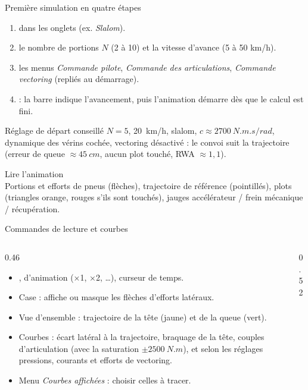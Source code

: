 \documentclass[aspectratio=169,9pt]{beamer}
\begin{document}
\begin{frame}{Première simulation en quatre étapes}
  \begin{enumerate}
    \item {} dans les onglets (ex. \emph{Slalom}).
    \item {} le nombre de portions $N$ (2 à 10) et la vitesse d'avance (5 à 50 km/h).
    \item {} les menus \emph{Commande pilote}, \emph{Commande des articulations}, \emph{Commande vectoring} (repliés au démarrage).
    \item {} : la barre indique l'avancement, puis l'animation démarre dès que le calcul est fini.
  \end{enumerate}
  \medskip
  \begin{block}{Réglage de départ conseillé}
    $N=5$, \SI{20}{km/h}, slalom, $c\approx\SI{2700}{N.m.s/rad}$, dynamique des vérins cochée, vectoring désactivé : le convoi suit la trajectoire (erreur de queue $\approx\SI{45}{cm}$, aucun plot touché, RWA $\approx1{,}1$).
  \end{block}
\end{frame}

\begin{frame}{Lire l'animation}
  \centering
  \\[1mm]
  {\footnotesize Portions et efforts de pneus (flèches), trajectoire de référence (pointillés), plots (triangles orange, rouges s'ils sont touchés), jauges accélérateur / frein mécanique / récupération.}
\end{frame}

\begin{frame}{Commandes de lecture et courbes}
  \begin{columns}[T]
  \begin{column}{0.46\textwidth}
    \begin{itemize}
      \item {},  d'animation (×1, ×2, …), curseur de temps.
      \item Case  : affiche ou masque les flèches d'efforts latéraux.
      \item Vue d'ensemble : trajectoire de la tête (jaune) et de la queue (vert).
      \item Courbes : écart latéral à la trajectoire, braquage de la tête, couples d'articulation (avec la saturation $\pm\SI{2500}{N.m}$), et selon les réglages pressions, courants et efforts de vectoring.
      \item Menu \emph{Courbes affichées} : choisir celles à tracer.
    \end{itemize}
  \end{column}
  \begin{column}{0.52\textwidth}
  \end{column}
  \end{columns}
\end{frame}
\end{document}

